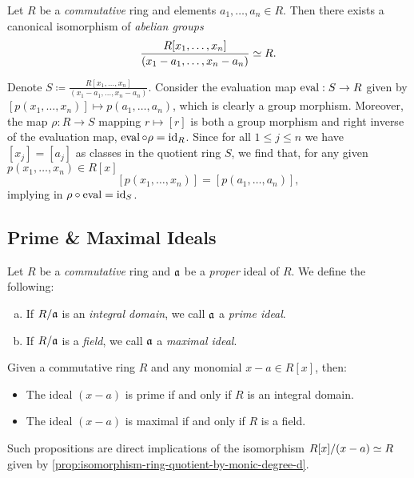 \begin{example}
\label{exp:multiple-var-eval-isomorphism}
Let \(R\) be a \emph{commutative} ring and elements \(a_1, \dots, a_n \in
R\). Then there exists a canonical isomorphism of \emph{abelian groups}
\[
\frac{R[x_1, \dots, x_n]}{(x_1 - a_1, \dots, x_n - a_n)} \simeq R.
\]

Denote \(S \coloneq \frac{R[x_1, \dots, x_n]}{(x_1 - a_1, \dots, x_n -
  a_n)}\). Consider the evaluation map \(\operatorname{eval}: S \to R\) given by
\([p(x_1, \dots, x_n)] \mapsto p(a_1, \dots, a_n)\), which is clearly a group
morphism. Moreover, the map \(\rho: R \to S\) mapping \(r \mapsto [r]\) is both
a group morphism and right inverse of the evaluation map,
\(\operatorname{eval} \circ \rho = \operatorname{id}_R\). Since for all \(1 \leq j \leq n\) we have
\([x_j] = [a_j]\) as classes in the quotient ring \(S\), we find that, for any
given \(p(x_1,\dots, x_n) \in R[x]\)
\[
[p(x_1, \dots, x_n)] = [p(a_1, \dots, a_n)],
\]
implying in \(\rho \circ \operatorname{eval} = \operatorname{id}_S\).
\end{example}

\subsection{Prime \& Maximal Ideals}

\begin{definition}
\label{def:prime-maximal-ideal}
Let \(R\) be a \emph{commutative} ring and \(\mathfrak{a}\) be a \emph{proper}
ideal of \(R\). We define the following:
\begin{enumerate}[(a)]\setlength\itemsep{0em}
\item If \(R/\mathfrak{a}\) is an \emph{integral domain}, we call \(\mathfrak{a}\) a
  \emph{prime ideal}.

\item If \(R/\mathfrak{a}\) is a \emph{field}, we call \(\mathfrak{a}\) a
  \emph{maximal ideal}.
\end{enumerate}
\end{definition}

\begin{example}
\label{exp:prime-maximal-principal-ideal-of-R[x]}
Given a commutative ring \(R\) and any monomial \(x - a \in R[x]\), then:
\begin{itemize}\setlength\itemsep{0em}
\item The ideal \((x - a)\) is prime if and only if \(R\) is an integral
  domain.
\item The ideal \((x - a)\) is maximal if and only if \(R\) is a field.
\end{itemize}
Such propositions are direct implications of the isomorphism
\(R[x]/(x - a) \simeq R\) given by
\cref{prop:isomorphism-ring-quotient-by-monic-degree-d}.
\end{example}

